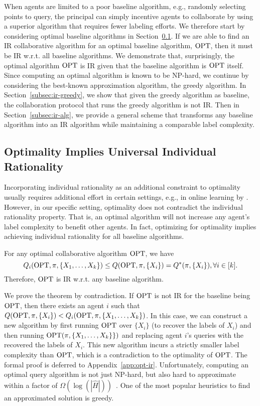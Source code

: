 When agents are limited to a poor baseline algorithm, e.g., randomly selecting points to query, the principal can simply incentive agents to collaborate by using a superior algorithm that requires fewer labeling efforts. 
We therefore start by considering optimal baseline algorithms in Section~\ref{subsec:ir-opt}.
If we are able to find an IR collaborative algorithm for an optimal baseline algorithm, $\textrm{OPT}$, then it must be IR w.r.t. all baseline algorithms.
We demonstrate that, surprisingly, the optimal algorithm $\textrm{OPT}$ is IR given that the baseline algorithm is $\textrm{OPT}$ itself.
Since computing an optimal algorithm is known to be NP-hard, we continue by considering the best-known approximation algorithm, the greedy algorithm. 
In Section~\ref{subsec:ir-greedy}, we show that given the greedy algorithm as baseline, the collaboration protocol that runs the greedy algorithm is not IR. 
Then in Section~\ref{subsec:ir-alg}, 
we provide a general scheme that transforms any baseline algorithm into an IR algorithm while maintaining a comparable label complexity.
%
\subsection{Optimality Implies Universal Individual Rationality}\label{subsec:ir-opt}
%
Incorporating individual rationality as an additional constraint to optimality usually requires additional effort in certain settings, e.g., in online learning by \citep{blum2020advancing}. 
However, in our specific setting, optimality does not contradict the individual rationality property. That is, an optimal algorithm will not increase any agent's label complexity to benefit other agents. 
In fact, optimizing for optimality implies achieving individual rationality for all baseline algorithms. 
\begin{theorem}\label{thm:opt-ir}
For any optimal collaborative algorithm $\textrm{OPT}$, we have $${Q_i(\textrm{OPT},\pi, \{X_1,\ldots,X_k\})} \leq Q(\textrm{OPT}, \pi, \{X_i\})= Q^*(\pi, \{X_i\}), \forall i\in [k].$$
    Therefore, $\textrm{OPT}$ is IR w.r.t. any baseline algorithm.
\end{theorem}

We prove the theorem by contradiction. If $\textrm{OPT}$ is not IR for the baseline being $\textrm{OPT}$, then there exists an agent $i$ such that $Q(\textrm{OPT}, \pi, \{X_i\}) < Q_i(\textrm{OPT},\pi, \{X_1,\ldots,X_k\})$. In this case, we can construct a new algorithm by first running $\textrm{OPT}$ over $\{X_i\}$ (to recover the labels of $X_i$)  and then running $\textrm{OPT}(\pi, \{X_1,\ldots,X_k\}\})$ and replacing agent $i$'s queries with the recovered the labels of $X_i$. This new algorithm incurs a strictly smaller label complexity than $\textrm{OPT}$, which is a contradiction to the optimality of $\textrm{OPT}$. The formal proof is deferred to Appendix~\ref{app:opt-ir}. 
Unfortunately, computing an optimal query algorithm is not just NP-hard, but also hard to approximate within
a factor of $\Omega(\log(|\hat H|))$~\citep{golovin2010near,chakaravarthy2007decision}. 
One of the most popular heuristics to find an approximated solution is greedy.
